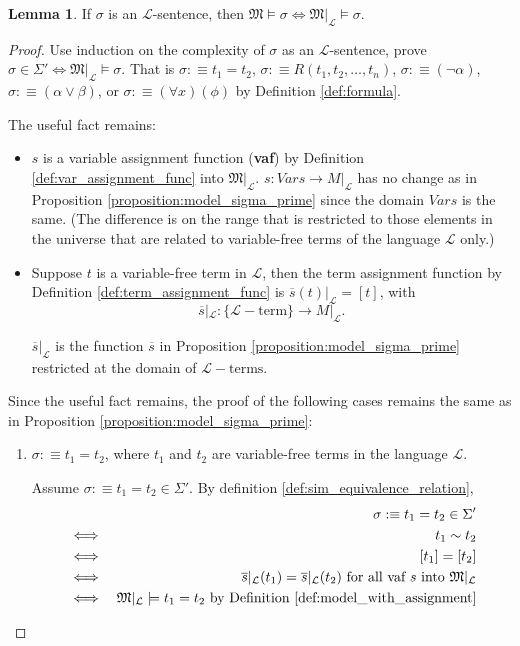 \documentclass[11pt,letterpaper]{book}
\theoremstyle{definition}
\newtheorem{lemma}{Lemma}[section]
\begin{document}
\begin{enumerate}
{\begin{lemma}
If $\sigma$ is an $\mathcal{L}$-sentence, then $\mathfrak{M} \models
\sigma \iff \mathfrak{M}|_{\mathcal{L}} \models \sigma $.
\end{lemma}
\begin{proof}
     Use induction on the complexity of $\sigma$ as an
$\mathcal{L}$-sentence, prove $  \sigma \in \Sigma' \iff
\mathfrak{M}|_{\mathcal{L}} \models \sigma$. That is $\sigma:\equiv t_1
= t_2$, $ \sigma:\equiv R(t_1 , t_2 , \ldots , t_n )$, $\sigma:\equiv
(\lnot \alpha)$, $\sigma:\equiv (\alpha \lor \beta)$, or $\sigma:\equiv
(\forall x) (\phi) $ by Definition \ref{def:formula}.

The useful fact remains:
\begin{itemize}
\item{$s$ is a variable assignment function (\textbf{vaf}) by Definition
\ref{def:var_assignment_func} into $\mathfrak{M}|_{\mathcal{L}}$. $s:
Vars \rightarrow M|_{\mathcal{L}}$ has no change as in Proposition
\ref{proposition:model_sigma_prime} since the domain $Vars$ is the same.
(The difference is on the range that is restricted to those elements in
the universe that are related to variable-free terms of the
language $\mathcal{L}$ only.)}
\item{Suppose $t$ is a variable-free term in $\mathcal{L}$, then the
term assignment function by Definition \ref{def:term_assignment_func} is
$\overline{s} (t)|_{\mathcal{L}} = [t] $, with $$
\overline{s}|_{\mathcal{L}} : \{ \mathcal{L}-\text{term} \} \rightarrow
M|_{\mathcal{L}} .$$

$\overline{s}|_\mathcal{L}$ is the function $\overline{s}$ in
Proposition \ref{proposition:model_sigma_prime} restricted at the domain
of $\mathcal{L}-\text{terms}$.}
\end{itemize}

Since the useful fact remains, the proof of the following cases remains
the same as in Proposition \ref{proposition:model_sigma_prime}:
\begin{enumerate}
\item{$\sigma :\equiv t_1 = t_2$, where $t_1$ and $t_2$ are
variable-free terms in the language $\mathcal{L}$.

Assume $\sigma :\equiv t_1 = t_2 \in \Sigma'$. By definition
\ref{def:sim_equivalence_relation},
\begin{eqnarray*}
&  & \sigma :\equiv t_1 = t_2 \in \Sigma' \\
& \iff & t_1 \sim t_2 \\
& \iff & [t_1] = [t_2] \\
& \iff & \overline{s}|_{\mathcal{L}} (t_1) = \overline{s}|_{\mathcal{L}}
(t_2) \text{ for all vaf $s$ into $\mathfrak{M}|_{\mathcal{L}}$} \\
& \iff & \mathfrak{M}|_{\mathcal{L}} \models t_1 = t_2 \text{ by
Definition \ref{def:model_with_assignment}}
\end{eqnarray*}
}


\end{enumerate}
\end{proof}}
\end{enumerate}
\end{document}
